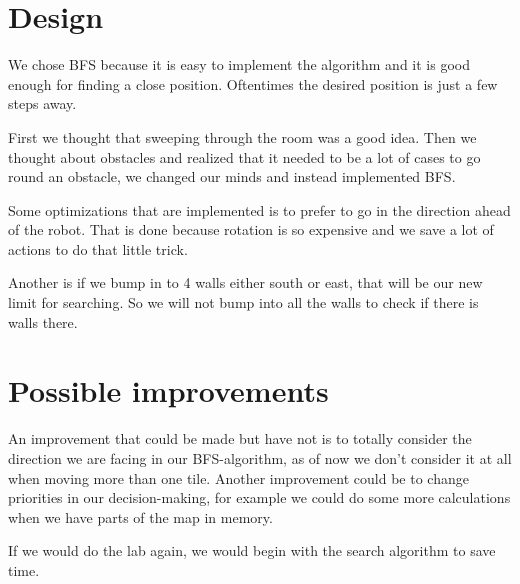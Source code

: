 \documentclass[12pt,a4paper]{article}
\begin{document}
\section{Design}
We chose BFS because it is easy to implement the algorithm and it is good enough for finding a close position. Oftentimes the desired position is just a few steps away.

First we thought that sweeping through the room was a good idea. Then we thought about obstacles and realized that it needed to be a lot of cases to go round an obstacle, we changed our minds and instead implemented BFS.

Some optimizations that are implemented is to prefer to go in the direction ahead of the robot. That is done because rotation is so expensive and we save a lot of actions to do that little trick.

Another is if we bump in to 4 walls either south or east, that will be our new limit for searching. So we will not bump into all the walls to check if there is walls there.

\section{Possible improvements}
An improvement that could be made but have not is to totally consider the direction we are facing in our BFS-algorithm, as of now we don’t consider it at all when moving more than one tile.
Another improvement could be to change priorities in our decision-making, for example we could do some more calculations when we have parts of the map in memory.

If we would do the lab again, we would begin with the search algorithm to save time.
\end{document}
